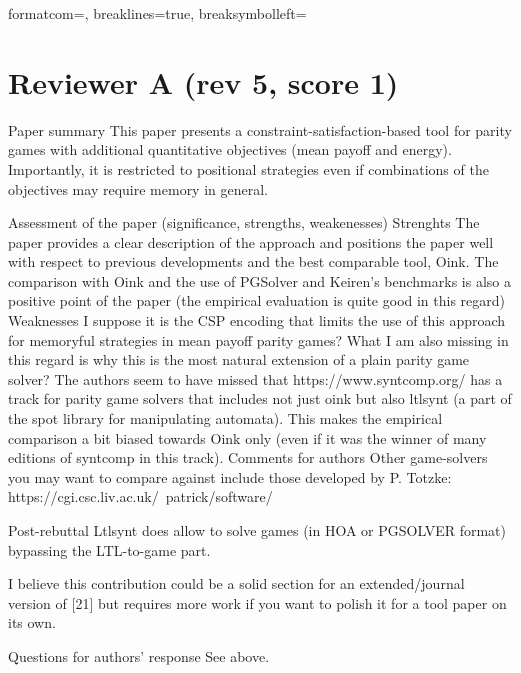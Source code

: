 \usepackage{xcolor}
\usepackage{fvextra}

\usepackage{amsmath}
\usepackage[hybrid]{markdown}

\usepackage{amsmath}
\usepackage[hybrid]{markdown}

  {formatcom=\color{darkblue}, breaklines=true, breaksymbolleft={}}




\section{Reviewer A (rev 5, score 1)}\label{rev:A}
\begin{reviewer}
Paper summary
This paper presents a constraint-satisfaction-based tool for parity games with additional quantitative objectives (mean payoff and energy). Importantly, it is restricted to positional strategies even if combinations of the objectives may require memory in general.

Assessment of the paper (significance, strengths, weakenesses)
Strenghts
The paper provides a clear description of the approach and positions the paper well with respect to previous developments and the best comparable tool, Oink.
The comparison with Oink and the use of PGSolver and Keiren's benchmarks is also a positive point of the paper (the empirical evaluation is quite good in this regard)
Weaknesses
I suppose it is the CSP encoding that limits the use of this approach for memoryful strategies in mean payoff parity games? What I am also missing in this regard is why this is the most natural extension of a plain parity game solver?
The authors seem to have missed that https://www.syntcomp.org/ has a track for parity game solvers that includes not just oink but also ltlsynt (a part of the spot library for manipulating automata). This makes the empirical comparison a bit biased towards Oink only (even if it was the winner of many editions of syntcomp in this track).
Comments for authors
Other game-solvers you may want to compare against include those developed by P. Totzke: https://cgi.csc.liv.ac.uk/~patrick/software/

Post-rebuttal
Ltlsynt does allow to solve games (in HOA or PGSOLVER format) bypassing the LTL-to-game part.

I believe this contribution could be a solid section for an extended/journal version of [21] but requires more work if you want to polish it for a tool paper on its own.

Questions for authors’ response
See above.
\end{reviewer}

